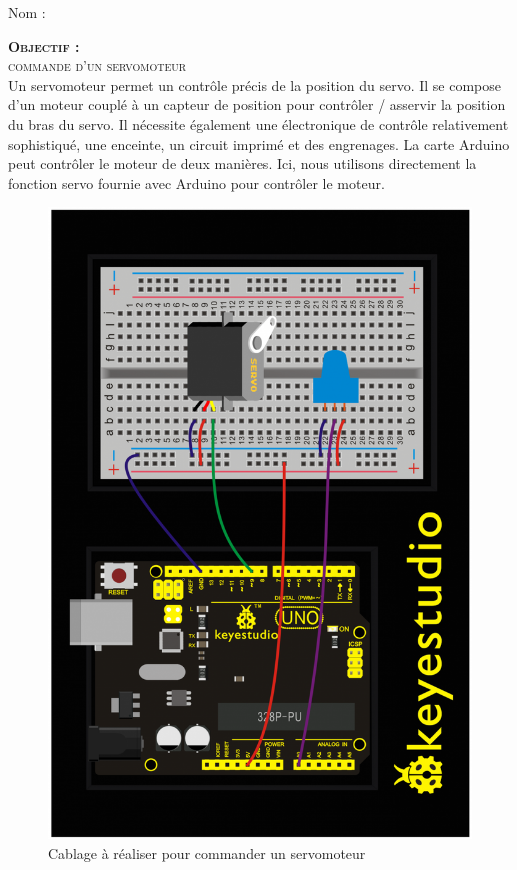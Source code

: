 \documentclass[a4paper, 11pt]{article}           %
\newcommand{\objectif}[1]{\textsc{\huge \textbf{Objectif :}\\[2mm] #1} }
\begin{document}
\sffamily


\hfill Nom : {\noindent\makebox[5cm]{\dotfill}\endgraf}

\objectif{commande d'un servomoteur}\\ %
Un servomoteur permet un contrôle précis de la position du servo. Il se compose d'un moteur couplé à un capteur de position pour contrôler / asservir la position du bras du servo. Il nécessite également une électronique de contrôle relativement sophistiqué, une enceinte, un circuit imprimé et des engrenages. La carte Arduino peut contrôler le moteur de deux manières. Ici, nous utilisons directement la fonction servo fournie avec Arduino pour contrôler le moteur.
\begin{figure}[!h]
\begin{center}
\includegraphics[height=\textwidth,angle=270]{cablage}
\caption{Cablage à réaliser pour commander un servomoteur}
\label{FigCablage}
\end{center}
\end{figure}

\end{document}
